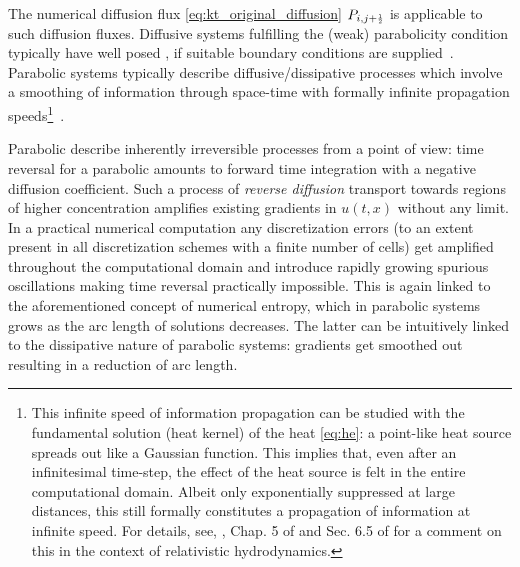 The numerical \kt{} diffusion flux \eqref{eq:kt_original_diffusion} $P_{i,j + \ttfrac{1}{2}}$ is applicable to such diffusion fluxes.
Diffusive systems fulfilling the (weak) parabolicity condition typically have well posed \ivps{}, if suitable boundary conditions are supplied~\cite{Krylov1987,Lieberman1996,Hunter2014,KTO2-0}.
Parabolic systems typically describe diffusive/dissipative processes which involve a smoothing of information through space-time with formally infinite propagation speeds\footnote{\label{footnote:HEinf}%
	This infinite speed of information propagation can be studied with the fundamental solution (heat kernel) of the heat \cref{eq:he}: a point-like heat source spreads out like a Gaussian function.
	This implies that, even after an infinitesimal time-step, the effect of the heat source is felt in the entire computational domain.
	Albeit only exponentially suppressed at large distances, this still formally constitutes a propagation of information at infinite speed.
	For details, see, \eg{}, Chap. 5 of  and Sec. 6.5 of  for a comment on this in the context of relativistic hydrodynamics.
}~\cite{Hunter2014,RezzollaZanotti:2013,Rezolla2020}.

Parabolic \pdes{} describe inherently irreversible processes from a \cfd{} point of view: time reversal for a parabolic \pde{} amounts to forward time integration with a negative diffusion coefficient.
Such a process of \textit{reverse diffusion} \dash{} transport towards regions of higher concentration \dash{} amplifies existing gradients in $u(t,x)$ without any limit.
In a practical numerical computation any discretization errors (to an extent present in all discretization schemes with a finite number of cells) get amplified throughout the computational domain and introduce rapidly growing spurious oscillations making time reversal practically impossible.
This is again linked to the aforementioned concept of numerical entropy, which in parabolic systems grows as the arc length of solutions decreases.
The latter can be intuitively linked to the dissipative nature of parabolic systems: gradients get smoothed out resulting in a reduction of arc length.

